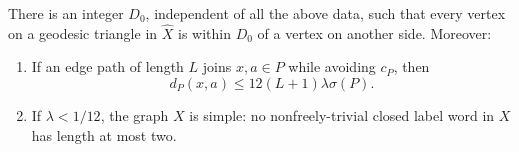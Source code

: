 \begin{proposition}\label{prop:cone-geometry}
There is an integer \(D_0\), independent of all the above data, such that
every vertex on a geodesic triangle in \(\widehat X\) is within \(D_0\) of
a vertex on another side. Moreover:
\begin{enumerate}[label=\textup{(\roman*)}]
\item\label{item:avoidance}
If an edge path of length \(L\) joins \(x,a\in P\) while avoiding
\(c_P\), then
\begin{equation}\label{eq:avoidance}
d_P(x,a)\le12(L+1)\lambda\sigma(P).
\end{equation}
\item\label{item:simple-cayley}
If \(\lambda<1/12\), the graph \(X\) is simple: no nonfreely-trivial
closed label word in \(X\) has length at most two.
\end{enumerate}
\end{proposition}

